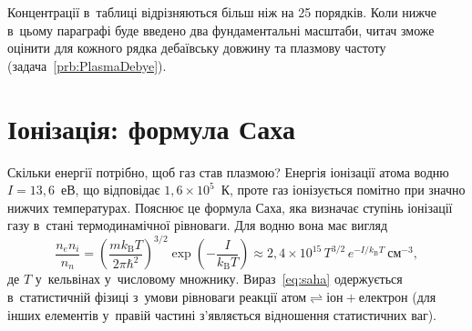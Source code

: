 Концентрації в~таблиці відрізняються більш ніж на 25 порядків. Коли нижче в~цьому
параграфі буде введено два фундаментальні масштаби, читач зможе оцінити для кожного рядка
дебаївську довжину та плазмову частоту (задача~\ref{prb:PlasmaDebye}).



\section{Іонізація: формула Саха}



Скільки енергії потрібно, щоб газ став плазмою? Енергія іонізації атома водню
$I=13{,}6$~еВ, що відповідає $1{,}6\times10^{5}$~К, проте газ іонізується помітно при
значно нижчих температурах. Пояснює це формула Саха, яка визначає ступінь іонізації газу
в~стані термодинамічної рівноваги. Для водню вона має вигляд
\begin{equation}\label{eq:saha}
	\frac{n_e n_i}{n_n} = \left(\frac{m k_{\mathrm B}T}{2\pi\hbar^2}\right)^{3/2}\exp\left(-\frac{I}{k_{\mathrm B}T}\right)
	\approx 2{,}4\times10^{15}\,T^{3/2}\,e^{-I/k_{\mathrm B}T}~\mathrm{см}^{-3},
\end{equation}
де $T$ у~кельвінах у~числовому множнику. Вираз~\eqref{eq:saha} одержується в~статистичній
фізиці з~умови рівноваги реакції $\text{атом}\rightleftharpoons\text{іон}+\text{електрон}$
(для інших елементів у~правій частині з'являється відношення статистичних ваг).

